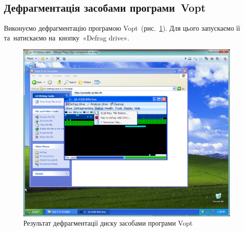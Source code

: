 \documentclass[
	a4paper,
	oneside,
	DIV = 12,
	fontsize = 13pt,
	headings = normal,
]{scrartcl}
\begin{document}
		\subsection{Дефрагментація засобами програми~\textenglish{Vopt}}
			Виконуємо дефрагментацію програмою \textenglish{Vopt}~(рис.~\ref{fig:03-vopt-defrag}). Для цього запускаємо її та~натискаємо на~кнопку~\textenglish{«Defrag drive»}.
			\begin{figure}[!htbp]
				\centering
				\includegraphics[height = 8\baselineskip]{./assets/lab-02-04.png}
				\caption{Результат дефрагментації диску засобами програми \textenglish{Vopt}}
				\label{fig:03-vopt-defrag}
			\end{figure}
\end{document}
